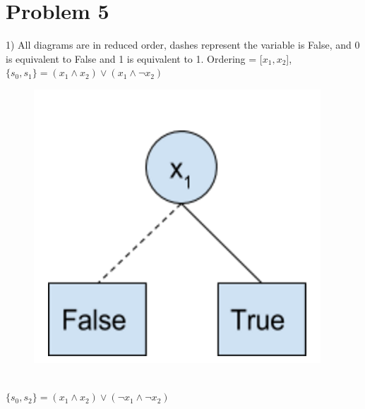 \documentclass{article}
\begin{document}
\section{Problem 5}
1) All diagrams are in reduced order, dashes represent the variable is False, and 0 is equivalent to False and 1 is equivalent to 1.
Ordering = [$x_1, x_2$], $\{s_0,s_1\} = (x_1 \land x_2) \lor (x_1 \land \neg x_2)$
\begin{figure}[!htb]
  \includegraphics[width=\linewidth]{6a1.png}
\endminipage\hfill
\end{figure}
\\ 
$\{s_0,s_2\} = (x_1 \land x_2) \lor (\neg x_1 \land \neg x_2)$\\
\end{document}
